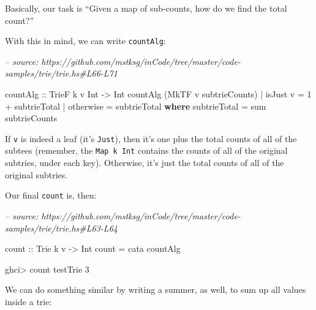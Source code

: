 \documentclass[]{article}
\newenvironment{Shaded}{}{}
\newcommand{\CommentTok}[1]{\textcolor[rgb]{0.38,0.63,0.69}{\textit{#1}}}
\newcommand{\DataTypeTok}[1]{\textcolor[rgb]{0.56,0.13,0.00}{#1}}
\newcommand{\DecValTok}[1]{\textcolor[rgb]{0.25,0.63,0.44}{#1}}
\newcommand{\FunctionTok}[1]{\textcolor[rgb]{0.02,0.16,0.49}{#1}}
\newcommand{\KeywordTok}[1]{\textcolor[rgb]{0.00,0.44,0.13}{\textbf{#1}}}
\newcommand{\NormalTok}[1]{#1}
\newcommand{\OtherTok}[1]{\textcolor[rgb]{0.00,0.44,0.13}{#1}}
\begin{document}
Basically, our task is ``Given a map of sub-counts, how do we find the total
count?''

With this in mind, we can write \texttt{countAlg}:

\begin{Shaded}
\begin{Highlighting}[]
\CommentTok{-- source: https://github.com/mstksg/inCode/tree/master/code-samples/trie/trie.hs#L66-L71}

\OtherTok{countAlg ::} \DataTypeTok{TrieF}\NormalTok{ k v }\DataTypeTok{Int} \OtherTok{->} \DataTypeTok{Int}
\NormalTok{countAlg (}\DataTypeTok{MkTF}\NormalTok{ v subtrieCounts)}
    \FunctionTok{|}\NormalTok{ isJust v  }\FunctionTok{=} \DecValTok{1} \FunctionTok{+}\NormalTok{ subtrieTotal}
    \FunctionTok{|}\NormalTok{ otherwise }\FunctionTok{=}\NormalTok{ subtrieTotal}
  \KeywordTok{where}
\NormalTok{    subtrieTotal }\FunctionTok{=}\NormalTok{ sum subtrieCounts}
\end{Highlighting}
\end{Shaded}

If \texttt{v} is indeed a leaf (it's \texttt{Just}), then it's one plus the
total counts of all of the subtees (remember, the \texttt{Map\ k\ Int} contains
the counts of all of the original subtries, under each key). Otherwise, it's
just the total counts of all of the original subtries.

Our final \texttt{count} is, then:

\begin{Shaded}
\begin{Highlighting}[]
\CommentTok{-- source: https://github.com/mstksg/inCode/tree/master/code-samples/trie/trie.hs#L63-L64}

\OtherTok{count ::} \DataTypeTok{Trie}\NormalTok{ k v }\OtherTok{->} \DataTypeTok{Int}
\NormalTok{count }\FunctionTok{=}\NormalTok{ cata countAlg}
\end{Highlighting}
\end{Shaded}

\begin{Shaded}
\begin{Highlighting}[]
\NormalTok{ghci}\FunctionTok{>}\NormalTok{ count testTrie}
\DecValTok{3}
\end{Highlighting}
\end{Shaded}

We can do something similar by writing a summer, as well, to sum up all values
inside a trie:
\end{document}
